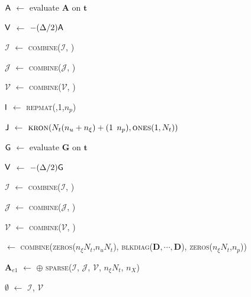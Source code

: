 \begin{vAlgorithm}[!ht]{1\columnwidth}{0em}
{$\textup{\textsf{A}}$ $\gets$ evaluate $\bm{A}$ on $\bm{t}$ %

$\textup{\textsf{V}}$ $\gets$ $-(\Delta/2) \textup{\textsf{A}}$

$\mathcal{I}$ $\gets$ \textsc{combine}($\mathcal{I}$, )

$\mathcal{J}$ $\gets$ \textsc{combine}($\mathcal{J}$, )

$\mathcal{V}$ $\gets$ \textsc{combine}($\mathcal{V}$, )


$\textup{\textsf{I}}$ $\gets$ \textsc{repmat}(,1,$n_p$) 

$\textup{\textsf{J}}$ $\gets$ $\textsc{kron}(N_t (n_u+n_\xi)+(1$ \KwTo $n_p), \textsc{ones}(1,N_t))$  

$\textup{\textsf{G}}$ $\gets$ evaluate $\bm{G}$ on $\bm{t}$ %

$\textup{\textsf{V}}$ $\gets$ $-(\Delta/2) \textup{\textsf{G}}$

$\mathcal{I}$ $\gets$ \textsc{combine}($\mathcal{I}$, )

$\mathcal{J}$ $\gets$ \textsc{combine}($\mathcal{J}$, )

$\mathcal{V}$ $\gets$ \textsc{combine}($\mathcal{V}$, )

}

 $\gets$ \textsc{combine}(\textsc{zeros}($n_{\xi} N_t$,$n_u N_t$), \textsc{blkdiag}($\bm{D},\cdots,\bm{D}$), \textsc{zeros}($n_{\xi} N_t$,$n_p$)) \label{line:ch5:D} 

$\mathbf{A}_{e1}$ $\gets$  $\oplus$ \textsc{sparse}($\mathcal{I}$, $\mathcal{J}$, $\mathcal{V}$, $n_\xi N_t$, $n_X$) 


$\emptyset$ $\gets$ $\mathcal{I}$, $\mathcal{V}$ 

\end{vAlgorithm}
